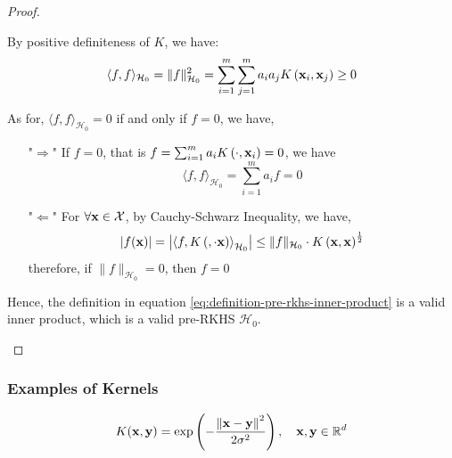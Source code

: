 \begin{proof}
\begin{enumerate}
\begin{enumerate}
			            By positive definiteness of $K$, we have:
			            \begin{equation*}
				            \langle f,f\rangle_{\mathcal{H}_{0}}=\|f\|_{\mathcal{H}_{0}}^{2}=\sum_{i=1}^{m}\sum_{j=1}^{m}a_{i}a_{j}K\left({\bf x}_{i},{\bf x}_{j}\right)\geq 0
			            \end{equation*}

			            As for, $\langle f,f\rangle_{\mathcal{H}_{0}}=0$ if and only if $f=0$, we have,
			            \begin{itemize}
				            \item["$\Rightarrow$"] If $f=0$, that is $f=\sum_{i=1}^{m}a_{i}K\left(\cdot,{\bf x}_{i}\right)=0$, we have
					            \begin{equation*}
						            \langle f,f\rangle_{\mathcal{H}_{0}}=\sum_{i=1}^{m}a_{i}f=0
					            \end{equation*}
				            \item["$\Leftarrow$"] For $\forall{\bf x}\in{\mathcal X}$, by Cauchy-Schwarz Inequality, we have,
					            \begin{equation*}
						            |f({\bf x})|=\left|\left\langle f,K\left(,\cdot{{\bf x}}\right)\right\rangle_{\mathcal{H}_{0}}\right|\leq\|f\|_{\mathcal{H}_{0}}\cdot K\left({\bf x},{\bf x}\right)^{\frac{1}{2}}
					            \end{equation*}
					            therefore, if $\|f\|_{\mathcal{H}_{0}}=0$, then $f=0$
			            \end{itemize}
		      \end{enumerate}
		      Hence, the definition in equation \eqref{eq:definition-pre-rkhs-inner-product} is a valid inner product, which is a valid pre-RKHS $\mathcal{H}_{0}$.
	\end{enumerate}
\end{proof}

\subsubsection{Examples of Kernels}

\begin{example}
	\begin{equation}
		K({\bf x},\mathbf{y})=\exp\left(-\frac{\left\|{\bf x}-\mathbf{y}\right\|^{2}}{2\sigma^{2}}\right),\quad{\bf x},\mathbf{y}\in{\mathbb R}^{d}
	\end{equation}
\end{example}

